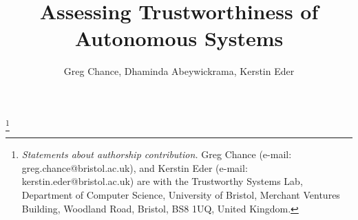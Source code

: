 \documentclass[runningheads,twocolumn,a4paper,10pt]{llncs}
\newcommand\nnfootnote[1]{%
  \begin{NoHyper}
  \renewcommand\thefootnote{}\footnote{#1}%
  \addtocounter{footnote}{-1}%
  \end{NoHyper}
}
\begin{document}
 

\title{Assessing Trustworthiness of Autonomous Systems}
\author{Greg Chance, Dhaminda Abeywickrama, Kerstin Eder}


\maketitle
\nnfootnote{
\textit{Statements about authorship contribution.}
%
Greg Chance (e-mail: greg.chance@bristol.ac.uk), 
and 
Kerstin Eder (e-mail: kerstin.eder@bristol.ac.uk) 
are with the Trustworthy Systems Lab, Department of Computer Science, University of Bristol, Merchant Ventures Building, Woodland Road, Bristol, BS8 1UQ, United Kingdom.
}


%
\makeatletter
\renewcommand\subsubsection{\@startsection{subsubsection}{3}{\z@}%
                       {-18\p@ \@plus -4\p@ \@minus -4\p@}%
                       {4\p@ \@plus 2\p@ \@minus 2\p@}%
                       {\normalfont\normalsize\bfseries\boldmath
                        \rightskip=\z@ \@plus 8em\pretolerance=10000 }}
\makeatother
\end{document}
